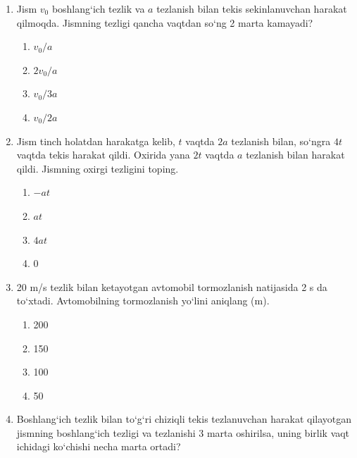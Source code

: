 \begin{enumerate}
\begin{enumerate}[label=\Alph*)]
\item $v=10-20t$
\item $v=10-0,17t$
\item $v=36-36t$
\item $v=36+36t$
\end{enumerate}

\item Jism $v_0$ boshlang‘ich tezlik va $a$ tezlanish bilan tekis
sekinlanuvchan harakat qilmoqda. Jismning tezligi qancha vaqtdan
so‘ng 2 marta kamayadi?

\begin{enumerate}[label=\Alph*)]
\item $v_0/a$
\item $2v_0/a$
\item $v_0/3a$
\item $v_0/2a$
\end{enumerate}

\item Jism tinch holatdan harakatga kelib, $t$ vaqtda $2a$ tezlanish
bilan, so‘ngra $4t$ vaqtda tekis harakat qildi. Oxirida yana $2t$
vaqtda $a$ tezlanish bilan harakat qildi. Jismning oxirgi tezligini toping.

\begin{enumerate}[label=\Alph*)]
\item $-at$
\item $at$
\item $4at$
\item $0$
\end{enumerate}



\item 20 m/s tezlik bilan ketayotgan avtomobil tormozlanish
natijasida 2 s da to‘xtadi. Avtomobilning tormozlanish
yo‘lini aniqlang (m).

\begin{enumerate}[label=\Alph*)]
\item 200
\item 150
\item 100
\item 50
\end{enumerate}

\item Boshlang‘ich tezlik bilan to‘g‘ri chiziqli tekis
tezlanuvchan harakat qilayotgan jismning boshlang‘ich
tezligi va tezlanishi 3 marta oshirilsa, uning birlik vaqt
ichidagi ko‘chishi necha marta ortadi?


\end{enumerate}
